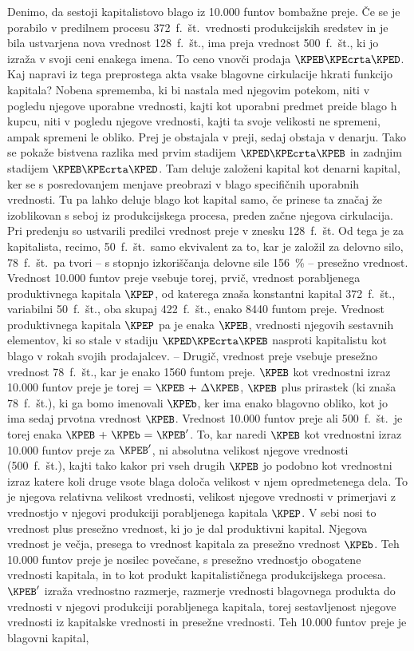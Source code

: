 \documentclass[kapital_02.tex]{subfiles}
\begin{document}
Denimo, da sestoji kapitalistovo blago iz 10.000 funtov bombažne preje. Če se je porabilo v predilnem procesu 372\ f.\ št.\ vrednosti produkcijskih sredstev in je bila ustvarjena nova vrednost 128\ f.\ št., ima preja vrednost 500\ f.\ št., ki jo izraža v svoji ceni enakega imena. To ceno vnovči prodaja \(\KPEB\KPEcrta\KPED\). Kaj napravi iz tega preprostega akta vsake blagovne cirkulacije hkrati funkcijo kapitala? Nobena sprememba, ki bi nastala med njegovim potekom, niti v pogledu njegove uporabne vrednosti, kajti kot uporabni predmet preide blago h kupcu, niti v pogledu njegove vrednosti, kajti ta svoje velikosti ne spremeni, ampak spremeni le obliko. Prej je obstajala v preji, sedaj obstaja v denarju. Tako se pokaže bistvena razlika med prvim stadijem \(\KPED\KPEcrta\KPEB\) in zadnjim stadijem \(\KPEB\KPEcrta\KPED\). Tam deluje založeni kapital kot denarni kapital, ker se s posredovanjem menjave preobrazi v blago specifičnih uporabnih vrednosti. Tu pa lahko deluje blago kot kapital samo, če prinese ta značaj že izoblikovan s seboj iz produkcijskega procesa, preden začne njegova cirkulacija. Pri predenju so ustvarili predilci vrednost preje v znesku 128\ f.\ št. Od tega je za kapitalista, recimo, 50\ f.\ št.\ samo ekvivalent za to, kar je založil za delovno silo, 78\ f.\ št.\ pa \KPEstran tvori -- s stopnjo izkoriščanja delovne sile 156~\% -- presežno vrednost. Vrednost 10.000 funtov preje vsebuje torej, prvič, vrednost porabljenega produktivnega kapitala \(\KPEP\), od katerega znaša konstantni kapital 372\ f.\ št., variabilni 50\ f.\ št., oba skupaj 422\ f.\ št., enako 8440 funtom preje. Vrednost produktivnega kapitala \(\KPEP\) pa je enaka \(\KPEB\), vrednosti njegovih sestavnih elementov, ki so stale v stadiju \(\KPED\KPEcrta\KPEB\) nasproti kapitalistu kot blago v rokah svojih prodajalcev. -- Drugič, vrednost preje vsebuje presežno vrednost 78\ f.\ št., kar je enako 1560 funtom preje. \(\KPEB\) kot vrednostni izraz 10.000 funtov preje je torej \(\textrm{= } \KPEB \textrm{ + } \Delta\KPEB\), \(\KPEB\) plus prirastek (ki znaša 78\ f.\ št.), ki ga bomo imenovali \(\KPEb\), ker ima enako blagovno obliko, kot jo ima sedaj prvotna vrednost \(\KPEB\). Vrednost 10.000 funtov preje ali 500\ f.\ št.\ je torej enaka \(\KPEB \textrm{ + } \KPEb \textrm{ = } \KPEB'\). To, kar naredi \(\KPEB\) kot vrednostni izraz 10.000 funtov preje za \(\KPEB'\), ni absolutna velikost njegove vrednosti (500\ f.\ št.), kajti tako kakor pri vseh drugih \(\KPEB\) jo podobno kot vrednostni izraz katere koli druge vsote blaga določa velikost v njem opredmetenega dela. To je njegova relativna velikost vrednosti, velikost njegove vrednosti v primerjavi z vrednostjo v njegovi produkciji porabljenega kapitala \(\KPEP\). V sebi nosi to vrednost plus presežno vrednost, ki jo je dal produktivni kapital. Njegova vrednost je večja, presega to vrednost kapitala za presežno vrednost \(\KPEb\). Teh 10.000 funtov preje je nosilec povečane, s presežno vrednostjo obogatene vrednosti kapitala, in to kot produkt kapitalističnega produkcijskega procesa. \(\KPEB'\) izraža vrednostno razmerje, razmerje vrednosti blagovnega produkta do vrednosti v njegovi produkciji porabljenega kapitala, torej sestavljenost njegove vrednosti iz kapitalske vrednosti in presežne vrednosti. Teh 10.000 funtov preje je blagovni kapital, 
\end{document}
